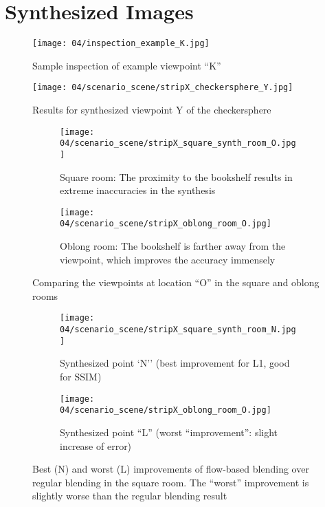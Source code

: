 \chapter{Synthesized Images}\label{imgs}

\begin{figure}
		\centering
		\texttt{[image: 04/inspection\_example\_K.jpg]}
		\caption{Sample inspection of example viewpoint ``K''}
		\label{fig:inspection_example}
\end{figure}

\begin{figure}
		\centering
    \texttt{[image: 04/scenario\_scene/stripX\_checkersphere\_Y.jpg]}
		\caption{Results for synthesized viewpoint Y of the checkersphere}
		\label{fig:scene_checkersphere_Y}
\end{figure}

\begin{figure}
\centering
    \hfill
    \begin{subfigure}[b]{\textwidth}
            \centering
            \texttt{[image: 04/scenario\_scene/stripX\_square\_synth\_room\_O.jpg]}
            \caption{Square room: The proximity to the bookshelf results in extreme inaccuracies in the synthesis}
    \end{subfigure}
    \hfill

    \hfill
    \begin{subfigure}[b]{\textwidth}
            \centering
            \texttt{[image: 04/scenario\_scene/stripX\_oblong\_room\_O.jpg]}
            \caption{Oblong room: The bookshelf is farther away from the viewpoint, which improves the accuracy immensely}
    \end{subfigure}
    \hfill
  \caption{Comparing the viewpoints at location ``O'' in the square and oblong rooms} \label{fig:scene_square_oblong_O}
\end{figure}

\begin{figure}
\centering
    \hfill
    \begin{subfigure}[b]{\textwidth}
            \centering
            \texttt{[image: 04/scenario\_scene/stripX\_square\_synth\_room\_N.jpg]}
            \caption{Synthesized point `N'' (best improvement for L1, good for SSIM)}
    \end{subfigure}
    \hfill

    \hfill
    \begin{subfigure}[b]{\textwidth}
            \centering
            \texttt{[image: 04/scenario\_scene/stripX\_oblong\_room\_O.jpg]}
            \caption{Synthesized point ``L'' (worst ``improvement'': slight increase of error)}
    \end{subfigure}
    \hfill
  \caption[Best and worst improvements of flow-based blending over regular blending in the square room]{Best (N) and worst (L) improvements of flow-based blending over regular blending in the square room. The ``worst'' improvement is slightly worse than the regular blending result} \label{fig:scene_square_best_worst}
\end{figure}

